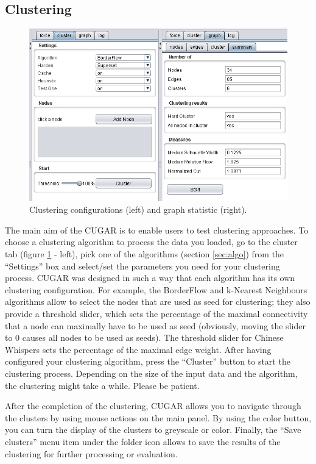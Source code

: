 \documentclass[a4paper, 11pt]{article}
\begin{document}
	\subsection{Clustering}	
		\begin{figure}[h!]
			\centering \includegraphics[width = 1\textwidth]{img/summary.png}
			\caption{Clustering configurations (left) and graph statistic (right).}	\label{fig:summary}
		\end{figure}
		
		The main aim of the CUGAR is to enable users to test clustering approaches. 
		To choose a clustering algorithm to process the data you loaded, go to the cluster tab (figure \ref{fig:summary} - left), 
		pick one of the algorithms (section \ref{sec:algo}) from the ``Settings'' box and select/set the parameters you need for your clustering process. 
		CUGAR was designed in such a way that each algorithm has its own clustering configuration. 
		For example, the BorderFlow and k-Nearest Neighbours algorithms allow to select the nodes that are used as seed for clustering; 
		they also provide a threshold slider, which sets the percentage of the maximal connectivity that a node can maximally have to be used as seed 
		(obviously, moving the slider to 0 causes all nodes to be used as seeds).
		The threshold slider for Chinese Whispers sets the percentage of the maximal edge weight.
		After having configured your clustering algorithm, press the ``Cluster'' button to start the clustering process. 
		Depending on the size of the input data and the algorithm, the clustering might take a while. Please be patient. 

		After the completion of the clustering, CUGAR allows you to navigate through the clusters by using mouse actions on the main panel. 
		By using the color button, you can turn the display of the clusters to greyscale or color. 
		Finally, the ``Save clusters'' menu item under the folder icon allows to save the results of the clustering for further processing or evaluation.
\end{document}
